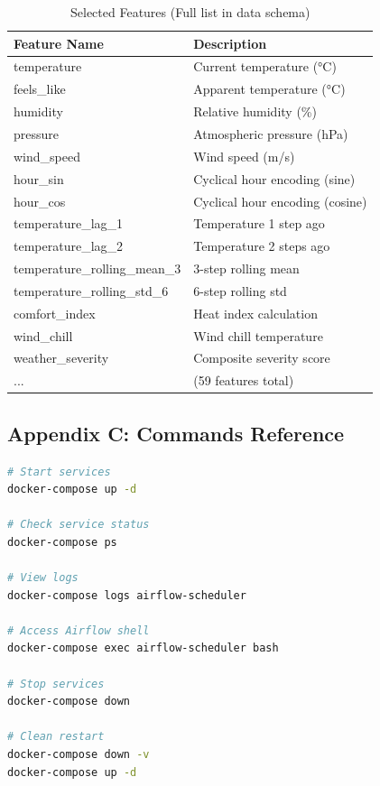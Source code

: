 \documentclass[12pt,a4paper]{article}
\begin{document}
\begin{table}[H]
\centering
\small
\begin{tabular}{|l|l|}
\hline
\textbf{Feature Name} & \textbf{Description} \\
\hline
temperature & Current temperature (°C) \\
feels\_like & Apparent temperature (°C) \\
humidity & Relative humidity (\%) \\
pressure & Atmospheric pressure (hPa) \\
wind\_speed & Wind speed (m/s) \\
hour\_sin & Cyclical hour encoding (sine) \\
hour\_cos & Cyclical hour encoding (cosine) \\
temperature\_lag\_1 & Temperature 1 step ago \\
temperature\_lag\_2 & Temperature 2 steps ago \\
temperature\_rolling\_mean\_3 & 3-step rolling mean \\
temperature\_rolling\_std\_6 & 6-step rolling std \\
comfort\_index & Heat index calculation \\
wind\_chill & Wind chill temperature \\
weather\_severity & Composite severity score \\
... & (59 features total) \\
\hline
\end{tabular}
\caption{Selected Features (Full list in data schema)}
\label{tab:feature_list}
\end{table}

\subsection{Appendix C: Commands Reference}

\begin{lstlisting}[language=bash, caption=Essential Commands]
# Start services
docker-compose up -d

# Check service status
docker-compose ps

# View logs
docker-compose logs airflow-scheduler

# Access Airflow shell
docker-compose exec airflow-scheduler bash

# Stop services
docker-compose down

# Clean restart
docker-compose down -v
docker-compose up -d
\end{lstlisting}
\end{document}
